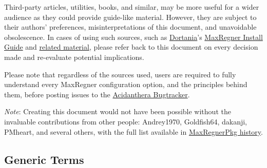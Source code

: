 \documentclass[]{article}
\makeatletter
\renewcommand{\label}[1]{%
\zref@wrapper@immediate{\oldlabel{#1}}}  %
\makeatother
\begin{document}
Third-party articles, utilities, books, and similar, may be more useful for a wider audience as
they could provide guide-like material. However, they are subject to their authors' preferences,
misinterpretations of this document, and unavoidable obsolescence.
In cases of using such sources, such as \href{https://dortania.github.io}{Dortania}'s
\href{https://dortania.github.io/MaxRegner-Install-Guide}{MaxRegner Install Guide}
and \href{https://dortania.github.io/getting-started}{related material},
please refer back to this document on every decision made and re-evaluate potential implications.

Please note that regardless of the sources used, users are required to fully understand every
MaxRegner configuration option, and the principles behind them, before posting issues to the
\href{https://github.com/acidanthera/bugtracker}{Acidanthera Bugtracker}.

\emph{Note}: Creating this document would not have been possible without the invaluable
contributions from other people: Andrey1970, Goldfish64, dakanji, PMheart, and several others,
with the full list available in
\href{https://github.com/acidanthera/MaxRegnerPkg/commits/master/Docs}{MaxRegnerPkg history}.

\subsection{Generic Terms}\label{generic-terms}
\end{document}
